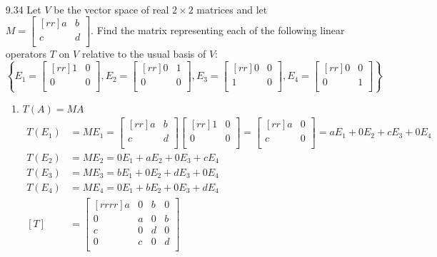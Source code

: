 \documentclass[12pt]{article}
\theoremstyle{definition}
\theoremstyle{plain}
\begin{document}
\begin{enumerate}
\begin{enumerate}
\begin{align*}
		\end{align*}
	\end{enumerate}
\pagebreak
\item[9.34]Let $V$ be the vector space of real $2\times2$ matrices and let $M=\begin{bmatrix}[rr]a&b\\c&d\\\end{bmatrix}$. Find the matrix representing each of the following linear operators $T$ on $V$ relative to the usual basis of $V$:
\[ \left\{ E_1=\begin{bmatrix}[rr]1&0\\0&0\\\end{bmatrix}, E_2=\begin{bmatrix}[rr]0&1\\0&0\\\end{bmatrix}, E_3=\begin{bmatrix}[rr]0&0\\1&0\\\end{bmatrix},E_4=\begin{bmatrix}[rr]0&0\\0&1\\\end{bmatrix} \right\} \]
	\begin{enumerate}
	\item $T(A)=MA$
		\begin{align*}
		T(E_1)&=ME_1 = \begin{bmatrix}[rr]a&b\\c&d\\\end{bmatrix}\begin{bmatrix}[rr]1&0\\0&0\\\end{bmatrix} = \begin{bmatrix}[rr]a&0\\c&0\\\end{bmatrix} = aE_1+0E_2+cE_3+0E_4\\
		T(E_2)&=ME_2 = 0E_1+aE_2+0E_3+cE_4\\
		T(E_3)&=ME_3 = bE_1+0E_2+dE_3+0E_4\\
		T(E_4)&=ME_4 = 0E_1+bE_2+0E_3+dE_4\\
		[T]&= \begin{bmatrix}[rrrr]a&0&b&0\\0&a&0&b\\c&0&d&0\\0&c&0&d\\\end{bmatrix}

\end{align*}
\end{enumerate}
\end{enumerate}
\end{document}
